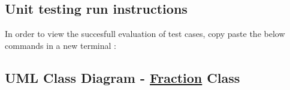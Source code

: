 \subsection*{Unit testing run instructions}

In order to view the succesfull evaluation of test cases, copy paste the below commands in a new terminal \+: 
\begin{DoxyCode}{0}
\end{DoxyCode}


\subsection*{U\+ML Class Diagram -\/ \mbox{\hyperlink{class_fraction}{Fraction}} Class}

 